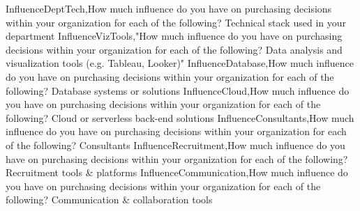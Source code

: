\begin{appendices}
InfluenceDeptTech,How much influence do you have on purchasing decisions within your organization for each of the following? Technical stack used in your department
InfluenceVizTools,"How much influence do you have on purchasing decisions within your organization for each of the following? Data analysis and visualization tools (e.g. Tableau, Looker)"
InfluenceDatabase,How much influence do you have on purchasing decisions within your organization for each of the following? Database systems or solutions
InfluenceCloud,How much influence do you have on purchasing decisions within your organization for each of the following? Cloud or serverless back-end solutions
InfluenceConsultants,How much influence do you have on purchasing decisions within your organization for each of the following? Consultants
InfluenceRecruitment,How much influence do you have on purchasing decisions within your organization for each of the following? Recruitment tools & platforms
InfluenceCommunication,How much influence do you have on purchasing decisions within your organization for each of the following? Communication & collaboration tools



\end{appendices}
